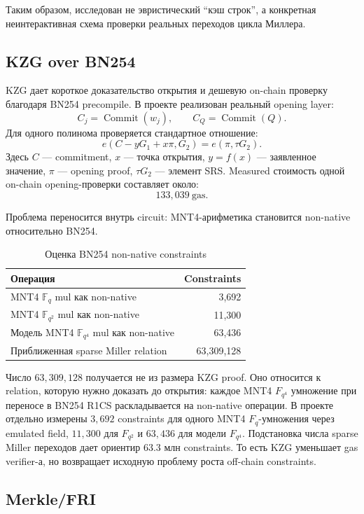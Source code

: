 \documentclass[12pt,a4paper]{article}
\newcommand{\Fq}{\mathbb{F}_q}
\newcommand{\Gas}{\mathrm{gas}}
\begin{document}
Таким образом, исследован не эвристический ``кэш строк'', а конкретная
неинтерактивная схема проверки реальных переходов цикла Миллера.

\subsection{KZG over BN254}

KZG дает короткое доказательство открытия и дешевую on-chain проверку благодаря
BN254 precompile. В проекте реализован реальный opening layer:
\[
    C_j=\operatorname{Commit}(w_j),\qquad
    C_Q=\operatorname{Commit}(Q).
\]
Для одного полинома проверяется стандартное отношение:
\[
    e(C-yG_1+x\pi,G_2)=e(\pi,\tau G_2).
\]
Здесь $C$ --- commitment, $x$ --- точка открытия, $y=f(x)$ ---
заявленное значение, $\pi$ --- opening proof, $\tau G_2$ --- элемент SRS.
Measured стоимость одной on-chain opening-проверки составляет около:
\[
    133{,}039\ \Gas.
\]

Проблема переносится внутрь circuit: MNT4-арифметика становится non-native
относительно BN254.

\begin{table}[htbp]
\centering
\caption{Оценка BN254 non-native constraints}
\small
\begin{tabular}{l r}
\toprule
Операция & Constraints \\
\midrule
MNT4 $\Fq$ mul как non-native & 3,692 \\
MNT4 $\mathbb{F}_{q^2}$ mul как non-native & 11,300 \\
Модель MNT4 $\mathbb{F}_{q^4}$ mul как non-native & 63,436 \\
Приближенная sparse Miller relation & 63,309,128 \\
\bottomrule
\end{tabular}
\end{table}

Число $63{,}309{,}128$ получается не из размера KZG proof. Оно относится к
relation, которую нужно доказать до открытия: каждое MNT4 $F_{q^4}$
умножение при переносе в BN254 R1CS раскладывается на non-native операции.
В проекте отдельно измерены $3{,}692$ constraints для одного MNT4
$F_q$-умножения через emulated field, $11{,}300$ для $F_{q^2}$ и
$63{,}436$ для модели $F_{q^4}$. Подстановка числа sparse Miller
переходов дает ориентир $63.3$ млн constraints. То есть KZG уменьшает
gas verifier-а, но возвращает исходную проблему роста off-chain constraints.

\subsection{Merkle/FRI}
\end{document}
